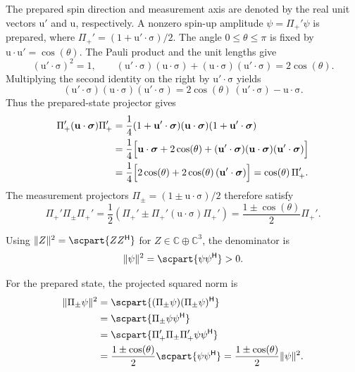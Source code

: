 \documentclass[11pt]{article}
\newcommand{\pv}[1]{{#1}}
\newcommand{\pvGreek}[1]{{#1}}
\newcommand{\vstyle}[1]{{\bm{\mathrm{#1}}}}
\newcommand{\pZ}{\pv{Z}}
\newcommand{\pvPi}{\pvGreek{\Pi}}
\newcommand{\pvpsi}{\pvGreek{\psi}}
\numberwithin{equation}{section}
\newcommand{\C}{\mathbb{C}}
\newcommand{\dotprod}{\cdot}
\newcommand{\bsig}{\vstyle{\sigma}}
\newcommand{\bu}{\vstyle{u}}
\begin{document}
The prepared spin direction and measurement axis are denoted by the real
unit vectors $\bu'$ and $\bu$, respectively. A nonzero spin-up amplitude
$\pvpsi=\pvPi_+'\pvpsi$ is prepared, where $\pvPi_+'=(1+\bu'\dotprod\bsig)/2$.
The angle $0\le\theta\le\pi$ is fixed by $\bu\dotprod\bu'=\cos(\theta)$.
The Pauli product and the unit lengths give
\[
 (\bu'\dotprod\bsig)^2=1,\qquad
 (\bu'\dotprod\bsig)(\bu\dotprod\bsig)
 +(\bu\dotprod\bsig)(\bu'\dotprod\bsig)=2\cos(\theta).
\]
Multiplying the second identity on the right by $\bu'\dotprod\bsig$ yields
\[
 (\bu'\dotprod\bsig)(\bu\dotprod\bsig)(\bu'\dotprod\bsig)
 =2\cos(\theta)\,(\bu'\dotprod\bsig)-\bu\dotprod\bsig.
\]
Thus the prepared-state projector gives
\[
 \begin{aligned}
 \pvPi_+'(\bu\dotprod\bsig)\pvPi_+'
 &=\frac14(1+\bu'\dotprod\bsig)(\bu\dotprod\bsig)(1+\bu'\dotprod\bsig)\\
 &=\frac14\Bigl[\bu\dotprod\bsig+2\cos(\theta)
       +(\bu'\dotprod\bsig)(\bu\dotprod\bsig)(\bu'\dotprod\bsig)\Bigr]\\
 &=\frac14\Bigl[2\cos(\theta)+2\cos(\theta)\,(\bu'\dotprod\bsig)\Bigr]
 =\cos(\theta)\,\pvPi_+'.
 \end{aligned}
\]
The measurement projectors $\pvPi_\pm=(1\pm\bu\dotprod\bsig)/2$ therefore satisfy
\begin{equation}
 \pvPi_+'\pvPi_\pm\pvPi_+'
 =\frac12(\pvPi_+'\pm\pvPi_+'(\bu\dotprod\bsig)\pvPi_+')
 =\frac{1\pm\cos(\theta)}{2}\pvPi_+'.
 \label{eq:spin-projector-overlap}
\end{equation}

Using $\lVert \pZ\rVert^2=\scpart{\pZ \pZ^{\mathsf H}}$ for $\pZ\in\C\oplus\C^3$,
the denominator is
\[
\lVert\pvpsi\rVert^2=\scpart{\pvpsi\pvpsi^{\mathsf H}}>0.
\]

For the prepared state, the projected squared norm is
\[
\begin{aligned}
\lVert\pvPi_\pm\pvpsi\rVert^2
&=\scpart{(\pvPi_\pm\pvpsi)(\pvPi_\pm\pvpsi)^{\mathsf H}}\\
&=\scpart{\pvPi_\pm\pvpsi\pvpsi^{\mathsf H}}\\
&=\scpart{\pvPi_+'\pvPi_\pm\pvPi_+'\pvpsi\pvpsi^{\mathsf H}}\\
&=\frac{1\pm\cos(\theta)}{2}\scpart{\pvpsi\pvpsi^{\mathsf H}}
=\frac{1\pm\cos(\theta)}{2}\lVert\pvpsi\rVert^2.
\end{aligned}
\]
\end{document}
